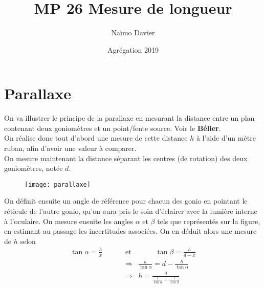 \documentclass[12pt,prb,aps,epsf]{article}
\begin{document}
	
	\title{MP 26 Mesure de longueur}
	\author{Naïmo Davier}
	\date{Agrégation 2019}
	
	\maketitle
	
	\tableofcontents
	
	\pagebreak
	
\section{Parallaxe}
On va illustrer le principe de la parallaxe en mesurant la distance entre un plan contenant deux goniomètres et un point/fente source. Voir le \textbf{Bélier}.\\ 
On réalise donc tout d'abord une mesure de cette distance $h$ à l'aide d'un mètre ruban, afin d'avoir une valeur à comparer.\\
On mesure maintenant la distance séparant les centres (de rotation) des deux goniomètres, notée $d$.
\begin{figure}[h]
	\centering \texttt{[image: parallaxe]}
\end{figure}
On définit ensuite un angle de référence pour chacun des gonio en pointant le réticule de l'autre gonio, qu'on aura pris le soin d'éclairer avec la lumière interne à l'oculaire. On mesure ensuite les angles $\alpha$ et $\beta$ tels que représentés sur la figure, en estimant au passage les incertitudes associées. On en déduit alors une mesure de $h$ selon 
\begin{eqnarray}
\tan\alpha = \frac{h}{x}\hspace{1cm}&\mathrm{et}&\hspace{1cm} \tan \beta = \frac{h}{d-x}\\
&\Longrightarrow& \frac{h}{\tan \alpha} = d - \frac{h}{\tan \alpha}\\
&\Longrightarrow& h = \frac{d}{\frac{1}{\tan\alpha} + \frac{1}{\tan\beta}}
\end{eqnarray}
\end{document}
